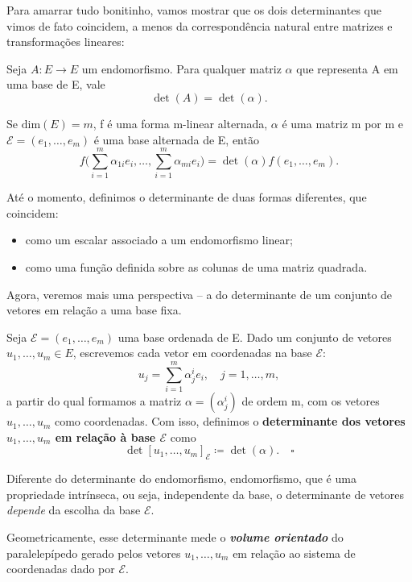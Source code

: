\documentclass[../differential_forms.tex]{subfiles}
\begin{document}
Para amarrar tudo bonitinho, vamos mostrar que os dois determinantes que vimos de fato coincidem, a menos da correspondência natural entre matrizes e transformações lineares:
\begin{prop*}
	Seja \(A:E\rightarrow E\) um endomorfismo. Para qualquer matriz \(\alpha \) que representa A em uma base de E, vale
	\[
		\det{(A)} = \det{(\alpha )}.
	\]
\end{prop*}
\begin{crl*}
	Se \(\mathrm{dim}(E)=m\), f é uma forma m-linear alternada, \(\alpha \) é uma matriz m por m e \(\mathcal{E}=(e_1,\dotsc , e_{m})\) é uma base alternada de E, então
	\[
		f\biggl(\sum\limits_{i=1}^{m}\alpha_{1i}e_{i}, \dotsc , \sum\limits_{i=1}^{m}\alpha_{mi}e_{i}\biggr) = \det{(\alpha )}f(e_1,\dotsc , e_{m}).
	\]
\end{crl*}

Até o momento, definimos o determinante de duas formas diferentes, que coincidem:
\begin{itemize}
	\item como um escalar associado a um endomorfismo linear;
	\item como uma função definida sobre as colunas de uma matriz quadrada.
\end{itemize}
Agora, veremos mais uma perspectiva -- a do determinante de um conjunto de vetores em relação a uma base fixa.
\begin{def*}
	Seja \(\mathcal{E}=(e_1,\dotsc , e_{m})\) uma base ordenada de E. Dado um conjunto de vetores \(u_1, \dotsc , u_{m}\in E\), escrevemos cada vetor em coordenadas na base \(\mathcal{E}:\)
	\[
		u_{j}=\sum\limits_{i=1}^{m} \alpha_{j}^{i}e_{i},\quad j=1,\dotsc ,m,
	\]
	a partir do qual formamos a matriz \(\alpha =(\alpha_{j}^{i})\) de ordem m, com os vetores \(u_1,\dotsc , u_{m}\) como coordenadas. Com isso, definimos o \textbf{determinante dos vetores \(u_1,\dotsc , u_{m}\) em relação à base \(\mathcal{E}\)} como
	\[
		\det{[u_{1},\dotsc , u_{m}]}_{\mathcal{E}}\coloneqq \det{(\alpha )}. \quad \square
	\]
\end{def*}
\begin{tcolorbox}[
		skin=enhanced,
		title=Observação,
		fonttitle=\bfseries,
		colframe=black,
		colbacktitle=cyan!75!white,
		colback=cyan!15,
		colbacklower=black,
		coltitle=black,
		drop fuzzy shadow,
	]
	Diferente do determinante do endomorfismo, endomorfismo, que é uma propriedade intrínseca, ou seja, independente da base, o determinante de vetores \textit{depende} da escolha da base \(\mathcal{E}.\)

	Geometricamente, esse determinante mede o \textit{\textbf{volume orientado}} do paralelepípedo gerado pelos vetores \(u_1,\dotsc , u_{m}\) em relação ao sistema de coordenadas dado por \(\mathcal{E}.\)
\end{tcolorbox}
\end{document}

